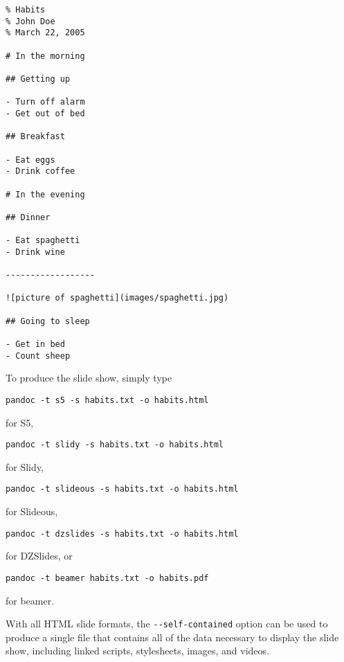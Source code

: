 \documentclass[]{article}
\begin{document}
\begin{verbatim}
% Habits
% John Doe
% March 22, 2005

# In the morning

## Getting up

- Turn off alarm
- Get out of bed

## Breakfast

- Eat eggs
- Drink coffee

# In the evening

## Dinner

- Eat spaghetti
- Drink wine

------------------

![picture of spaghetti](images/spaghetti.jpg)

## Going to sleep

- Get in bed
- Count sheep
\end{verbatim}

To produce the slide show, simply type

\begin{verbatim}
pandoc -t s5 -s habits.txt -o habits.html
\end{verbatim}

for S5,

\begin{verbatim}
pandoc -t slidy -s habits.txt -o habits.html
\end{verbatim}

for Slidy,

\begin{verbatim}
pandoc -t slideous -s habits.txt -o habits.html
\end{verbatim}

for Slideous,

\begin{verbatim}
pandoc -t dzslides -s habits.txt -o habits.html
\end{verbatim}

for DZSlides, or

\begin{verbatim}
pandoc -t beamer habits.txt -o habits.pdf
\end{verbatim}

for beamer.

With all HTML slide formats, the \texttt{-{}-self-contained} option can
be used to produce a single file that contains all of the data necessary
to display the slide show, including linked scripts, stylesheets,
images, and videos.

\end{document}
